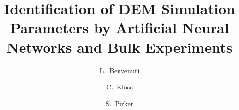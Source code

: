 
\title{Identification of DEM Simulation Parameters by Artificial Neural Networks
and Bulk Experiments}


\author[jku]{L.~Benvenuti}

\author[dcs]{C.~Kloss}

\author[jku]{S.~Pirker}


\address[jku]{Johannes Kepler University Linz, Department on Particulate Flow
Modelling, Altenbergerstrasse 69, 4040, Linz, Austria}

\address[dcs]{DCS Computing GmbH, Altenbergerstr. 66a - Science Park, 4040 Linz,
Austria}
